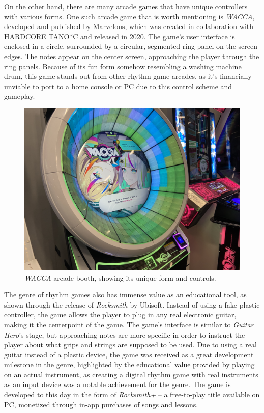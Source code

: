 On the other hand, there are many arcade games that have unique controllers with various forms. 
One such arcade game that is worth mentioning is \textit{WACCA}, developed and published by Marvelous, which was created in collaboration with HARDCORE TANO*C and released in 2020. The game's user interface is enclosed in a circle, surrounded by a circular, segmented ring panel on the screen edges. The notes appear on the center screen, approaching the player through the ring panels. Because of its fun form somehow resembling a washing machine drum, this game stands out from other rhythm game arcades, as it's financially unviable to port to a home console or PC due to this control scheme and gameplay.
\pagebreak

\begin{figure}[h]
    \centering\includegraphics[scale=0.1]{obrazki/waccaarcade.jpg}
    \caption{\textit{WACCA} arcade booth, showing its unique form and controls. \cite{waccaarcade}}
    \label{fig:wacca_arcade}
\end{figure}

The genre of rhythm games also has immense value as an educational tool, as shown through the release of \textit{Rocksmith} by Ubisoft. Instead of using a fake plastic controller, the game allows the player to plug in any real electronic guitar, making it the centerpoint of the game. The game's interface is similar to \textit{Guitar Hero}'s stage, but approaching notes are more specific in order to instruct the player about what grips and strings are supposed to be used. Due to using a real guitar instead of a plastic device, the game was received as a great development milestone in the genre, highlighted by the educational value provided by playing on an actual instrument, as creating a digital rhythm game with real instruments as an input device was a notable achievement for the genre. The game is developed to this day in the form of \textit{Rocksmith+} -- a free-to-play title available on PC, monetized through in-app purchases of songs and lessons.


